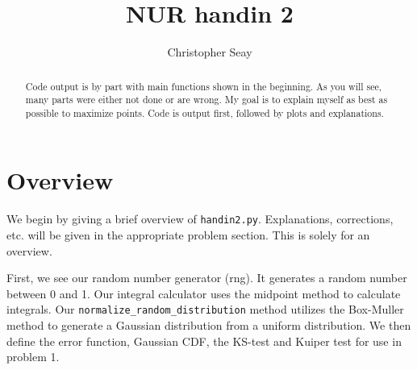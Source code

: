 \documentclass[a4paper,10pt]{article}
\title{NUR handin 2}
\author{Christopher Seay}
\begin{document}
\maketitle

\begin{abstract}
 Code output is by part with main functions shown in the beginning.
 As you will see, many parts were either not done or are wrong. 
 My goal is to explain myself as best as possible to maximize points.
 Code is output first, followed by plots and explanations.
\end{abstract}

\section*{Overview}
 We begin by giving a brief overview of \texttt{handin2.py}. Explanations,
 corrections, etc. will be given in the appropriate problem section. This is
 solely for an overview.
 
First, we see our random number generator (rng). It generates a random number
between 0 and 1. Our integral calculator uses the midpoint method to calculate 
integrals. Our \texttt{normalize\_random\_distribution} method utilizes the
Box-Muller method to generate a Gaussian distribution from a uniform 
distribution. We then define the error function, Gaussian CDF, the 
KS-test and Kuiper test for use in problem 1.










































\end{document}
